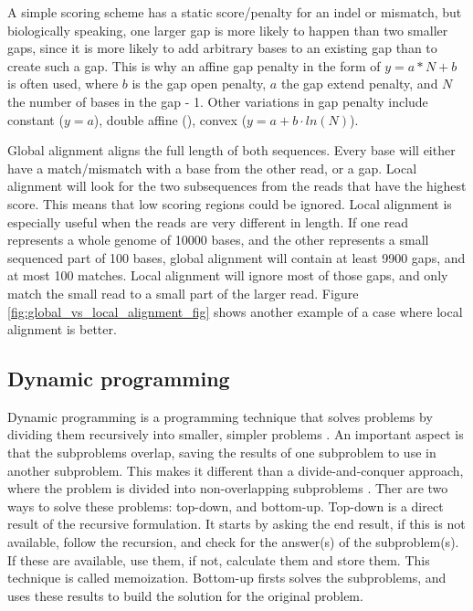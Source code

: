 \documentclass[../main/thesis.tex]{subfiles}
\begin{document}
A simple scoring scheme has a static score/penalty for an indel or mismatch, but biologically speaking, one larger gap is more likely to happen than two smaller gaps, since it is more likely to add arbitrary bases to an existing gap than to create such a gap.
This is why an affine gap penalty in the form of $y = a*N+b$ is often used, where $b$ is the gap open penalty, $a$ the gap extend penalty, and $N$ the number of bases in the gap - 1.
Other variations in gap penalty include constant ($y = a$), double affine (), convex ($y = a+b\cdot ln(N)$).

Global alignment aligns the full length of both sequences.
Every base will either have a match/mismatch with a base from the other read, or a gap.
Local alignment will look for the two subsequences from the reads that have the highest score.
This means that low scoring regions could be ignored.
Local alignment is especially useful when the reads are very different in length.
If one read represents a whole genome of 10000 bases, and the other represents a small sequenced part of 100 bases, global alignment will contain at least 9900 gaps, and at most 100 matches.
Local alignment will ignore most of those gaps, and only match the small read to a small part of the larger read.
Figure \ref{fig:global_vs_local_alignment_fig} shows another example of a case where local alignment is better.


\subsection{Dynamic programming}
Dynamic programming is a programming technique that solves problems by dividing them recursively into smaller, simpler problems \cite{Dynamic_programming1}.
An important aspect is that the subproblems overlap, saving the results of one subproblem to use in another subproblem.
This makes it different than a divide-and-conquer approach, where the problem is divided into non-overlapping subproblems \cite{Dynamic_programming2}.
Ther are two ways to solve these problems: top-down, and bottom-up.
Top-down is a direct result of the recursive formulation.
It starts by asking the end result, if this is not available, follow the recursion, and check for the answer(s) of the subproblem(s).
If these are available, use them, if not, calculate them and store them.
This technique is called memoization.
Bottom-up firsts solves the subproblems, and uses these results to build the solution for the original problem.
\end{document}
